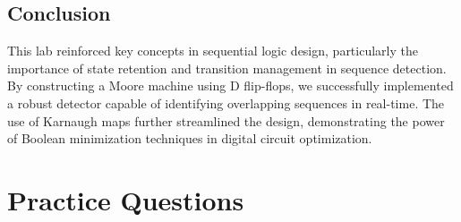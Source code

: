 \documentclass[12pt]{article}
\begin{document}
\subsection*{Conclusion}
This lab reinforced key concepts in sequential logic design, particularly the importance of state retention and transition management in sequence detection. By constructing a Moore machine using D flip-flops, we successfully implemented a robust detector capable of identifying overlapping sequences in real-time. The use of Karnaugh maps further streamlined the design, demonstrating the power of Boolean minimization techniques in digital circuit optimization.
\section*{Practice Questions}
\end{document}
